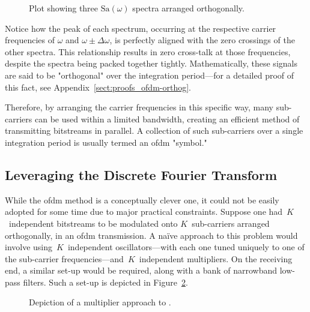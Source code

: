 \documentclass[class=report,11pt,crop=false]{standalone}
\begin{document}
\begin{figure}[htbp]
    \centering
    \captionsetup{type=figure}
    \def\svgwidth{0.8\linewidth}
    { %
        }
    \caption{Plot showing three \(\mathrm{Sa}(\omega)\) spectra arranged orthogonally.}
    \label{fig:ofdm-three-sincs}
\end{figure}

Notice how the peak of each spectrum, occurring at the respective carrier frequencies of \(\omega\) and \(\omega\pm\Delta\omega\), is perfectly aligned with the zero crossings of the other spectra. This relationship results in zero cross-talk at those frequencies, despite the spectra being packed together tightly. Mathematically, these signals are said to be "orthogonal" over the integration period---for a detailed proof of this fact, see Appendix~\ref{sect:proofs_ofdm-orthog}.

Therefore, by arranging the carrier frequencies in this specific way, many sub-carriers can be used within a limited bandwidth, creating an efficient method of transmitting bitstreams in parallel. A collection of such sub-carriers over a single integration period is usually termed an \gls{ofdm} "symbol."

\subsection{Leveraging the Discrete Fourier Transform \label{subsect:dab-std_dft}}
While the \gls{ofdm} method is a conceptually clever one, it could not be easily adopted for some time due to major practical constraints. Suppose one had~\(K\)~independent bitstreams to be modulated onto \(K\)~sub-carriers arranged orthogonally, in an \gls{ofdm} transmission. A na\"ive approach to this problem would involve using~\(K\)~independent oscillators---with each one tuned uniquely to one of the sub-carrier frequencies---and~\(K\)~independent multipliers. On the receiving end, a similar set-up would be required, along with a bank of narrowband low-pass filters. Such a set-up is depicted in Figure~\ref{fig:ofdm-multipliers}.

\begin{figure}
    \centering
    \captionsetup{type=figure}
    \def\svgwidth{0.90\linewidth}
    {
        \scriptsize
        
    }
    \caption{Depiction of a multiplier approach to .}
    \label{fig:ofdm-multipliers}
\end{figure}
\end{document}
